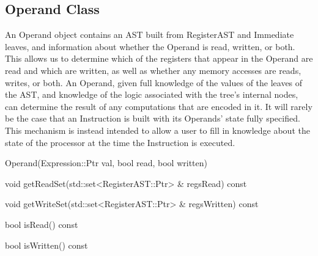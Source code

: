 \subsection{Operand Class}
\label{sec:operand}

An Operand object contains an AST built from RegisterAST and Immediate leaves,
and information about whether the Operand is read, written, or both. This allows
us to determine which of the registers that appear in the Operand are read and
which are written, as well as whether any memory accesses are reads, writes, or
both. An Operand, given full knowledge of the values of the leaves of the AST,
and knowledge of the logic associated with the tree's internal nodes, can
determine the result of any computations that are encoded in it. It will rarely
be the case that an Instruction is built with its Operands' state fully
specified. This mechanism is instead intended to allow a user to fill in
knowledge about the state of the processor at the time the Instruction is
executed. 

\begin{apient}
Operand(Expression::Ptr val, bool read, bool written)
\end{apient}

\begin{apient}
void getReadSet(std::set<RegisterAST::Ptr> & regsRead) const
\end{apient}

\begin{apient}
void getWriteSet(std::set<RegisterAST::Ptr> & regsWritten) const
\end{apient}

\begin{apient}
bool isRead() const
\end{apient}

\begin{apient}
bool isWritten() const
\end{apient}


